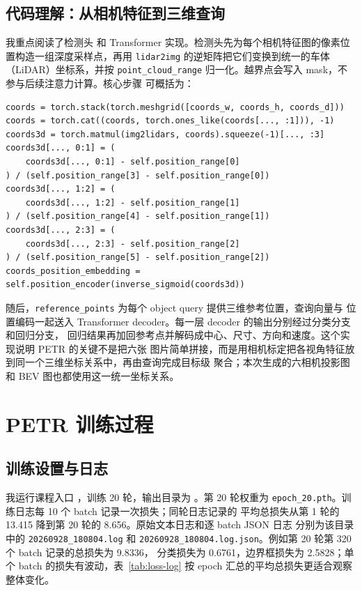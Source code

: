 \documentclass[UTF8,zihao=5,scheme=chinese]{ctexart}
\begin{document}
\subsection{代码理解：从相机特征到三维查询}

我重点阅读了检测头
和 Transformer 实现。检测头先为每个相机特征图的像素位置构造一组深度采样点，再用
\texttt{lidar2img} 的逆矩阵把它们变换到统一的车体（LiDAR）坐标系，并按
\texttt{point\_cloud\_range} 归一化。越界点会写入 mask，不参与后续注意力计算。核心步骤
可概括为：

\begin{verbatim}
coords = torch.stack(torch.meshgrid([coords_w, coords_h, coords_d]))
coords = torch.cat((coords, torch.ones_like(coords[..., :1])), -1)
coords3d = torch.matmul(img2lidars, coords).squeeze(-1)[..., :3]
coords3d[..., 0:1] = (
    coords3d[..., 0:1] - self.position_range[0]
) / (self.position_range[3] - self.position_range[0])
coords3d[..., 1:2] = (
    coords3d[..., 1:2] - self.position_range[1]
) / (self.position_range[4] - self.position_range[1])
coords3d[..., 2:3] = (
    coords3d[..., 2:3] - self.position_range[2]
) / (self.position_range[5] - self.position_range[2])
coords_position_embedding = self.position_encoder(inverse_sigmoid(coords3d))
\end{verbatim}

随后，\texttt{reference\_points} 为每个 object query 提供三维参考位置，查询向量与
位置编码一起送入 Transformer decoder。每一层 decoder 的输出分别经过分类分支和回归分支，
回归结果再加回参考点并解码成中心、尺寸、方向和速度。这个实现说明 PETR 的关键不是把六张
图片简单拼接，而是用相机标定把各视角特征放到同一个三维坐标关系中，再由查询完成目标级
聚合；本次生成的六相机投影图和 BEV 图也都使用这一统一坐标关系。

\section{PETR 训练过程}

\subsection{训练设置与日志}

我运行课程入口 ，训练 20 轮，输出目录为
。第 20 轮权重为
\texttt{epoch\_20.pth}。训练日志每 10 个 batch 记录一次损失；同轮日志记录的
平均总损失从第 1 轮的 13.415 降到第 20 轮的 8.656。原始文本日志和逐 batch JSON 日志
分别为该目录中的 \texttt{20260928\_180804.log} 和
\texttt{20260928\_180804.log.json}。例如第 20 轮第 320 个 batch 记录的总损失为 9.8336，
分类损失为 0.6761，边界框损失为 2.5828；单个 batch 的损失有波动，表~\ref{tab:loss-log}
按 epoch 汇总的平均总损失更适合观察整体变化。
\end{document}

